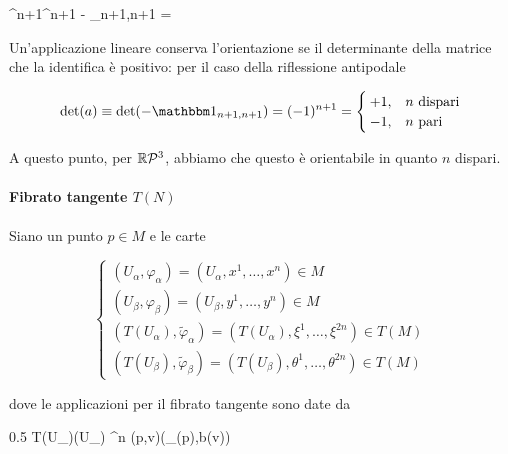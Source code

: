{
{\R^{n+1}}{\R^{n+1}}
{}{%
										- \bigone_{n+1,n+1}  %
										=  
										}

Un'applicazione lineare conserva l'orientazione se il determinante della matrice che la identifica è positivo: per il caso della riflessione antipodale

\begin{equation}
	\det(a) \equiv \det( - \bigone_{n+1,n+1} ) = (-1)^{n+1} = %
	\begin{cases}
		+ 1, & n \text{ dispari} \\
		- 1, & n \text{ pari}
	\end{cases}
\end{equation}

A questo punto, per $ \mathbb{R}\mathcal{P}^{3} $, abbiamo che questo è orientabile in quanto $ n $ dispari.

\paragraph{Fibrato tangente $ T(N) $}


Siano un punto $ p \in M $ e le carte

\begin{equation}
	\begin{cases}
		(U_{\alpha},\varphi_{\alpha}) = (U_{\alpha},x^{1},\dots,x^{n}) \in M \\
		(U_{\beta},\varphi_{\beta}) = (U_{\beta},y^{1},\dots,y^{n}) \in M \\
		(T(U_{\alpha}),\tilde{\varphi}_{\alpha}) = (T(U_{\alpha}),\xi^{1},\dots,\xi^{2n}) \in T(M) \\
		(T(U_{\beta}),\tilde{\varphi}_{\beta}) = (T(U_{\beta}),\theta^{1},\dots,\theta^{2n}) \in T(M)
	\end{cases}
\end{equation}

dove le applicazioni per il fibrato tangente sono date da

	{0.5}{%
			\map{\tilde{\varphi}_{\beta}}
				{T(U_{\beta})}{\varphi(U_{\beta}) \times \R^{n}}
				{(p,v)}{(\varphi_{\beta}(p),b(v))}
			}

}
